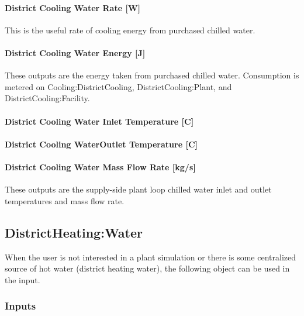 \paragraph{District Cooling Water Rate {[}W{]}}\label{district-cooling-chilled-water-rate-w}

This is the useful rate of cooling energy from purchased chilled water. 

\paragraph{District Cooling Water Energy {[}J{]}}\label{district-cooling-chilled-water-energy-j}

These outputs are the energy taken from purchased chilled water. Consumption is metered on Cooling:DistrictCooling, DistrictCooling:Plant, and DistrictCooling:Facility.

\paragraph{District Cooling Water Inlet Temperature {[}C{]}}\label{district-cooling-inlet-temperature-c}

\paragraph{District Cooling WaterOutlet Temperature {[}C{]}}\label{district-cooling-outlet-temperature-c}

\paragraph{District Cooling Water Mass Flow Rate {[}kg/s{]}}\label{district-cooling-mass-flow-rate-kgs}

These outputs are the supply-side plant loop chilled water inlet and outlet temperatures and mass flow rate.

\subsection{DistrictHeating:Water}\label{districtheating}

When the user is not interested in a plant simulation or there is some centralized source of hot water (district heating water), the following object can be used in the input.

\subsubsection{Inputs}\label{inputs-17-006}

